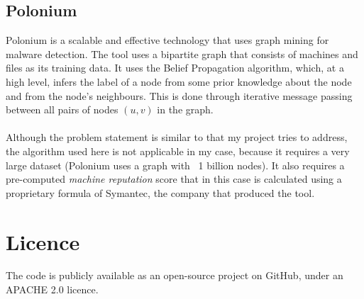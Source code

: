 	
	\subsection{Polonium}
	Polonium is a scalable and effective technology that uses graph mining for malware detection. The tool uses a bipartite graph that consists of machines and files as its training data. It uses the Belief Propagation algorithm, which, at a high level, infers the label of a node from some prior knowledge about the node and from the node's neighbours. This is done through iterative message passing between all pairs of nodes $(u, v)$ in the graph. 
	\\ \\
	Although the problem statement is similar to that my project tries to address, the algorithm used here is not applicable in my case, because it requires a very large dataset (Polonium uses a graph with ~1 billion nodes). It also requires a pre-computed \textit{machine reputation} score that in this case is calculated using a proprietary formula of Symantec\footnotemark[2], the company that produced the tool. 
	
	
	\section{Licence} 
	The code is publicly available as an open-source project on GitHub\footnotemark[3], under an APACHE 2.0 licence\footnotemark[4]. 
	
	
